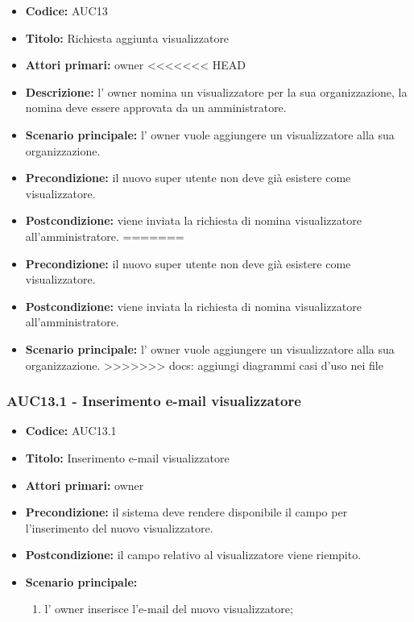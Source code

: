 \documentclass[casi-duso]{subfiles}
\begin{document}
\begin{itemize}
  \item \textbf{Codice:} AUC13
  \item \textbf{Titolo:} Richiesta aggiunta visualizzatore
  \item \textbf{Attori primari:} owner
<<<<<<< HEAD
  \item \textbf{Descrizione:} l' owner nomina un visualizzatore per la sua organizzazione, la nomina deve essere approvata da un amministratore.
  \item \textbf{Scenario principale:} l' owner vuole aggiungere un visualizzatore alla sua organizzazione.
  \item \textbf{Precondizione:} il nuovo super utente non deve già esistere come visualizzatore.
  \item \textbf{Postcondizione:} viene inviata la richiesta di nomina visualizzatore all'amministratore.
=======
  \item \textbf{Precondizione:} il nuovo super utente non deve già esistere come visualizzatore.
  \item \textbf{Postcondizione:} viene inviata la richiesta di nomina visualizzatore all'amministratore.
  \item \textbf{Scenario principale:} l' owner vuole aggiungere un visualizzatore alla sua organizzazione.
>>>>>>> docs: aggiungi diagrammi casi d'uso nei file
\end{itemize}

\subsubsection{AUC13.1 - Inserimento e-mail visualizzatore}%
\label{subsub:AUC13.1}
\begin{itemize}
  \item \textbf{Codice:} AUC13.1
  \item \textbf{Titolo:} Inserimento e-mail visualizzatore
  \item \textbf{Attori primari:} owner
  \item \textbf{Precondizione:} il sistema deve rendere disponibile il campo per l'inserimento del nuovo visualizzatore.
  \item \textbf{Postcondizione:} il campo relativo al visualizzatore viene riempito.
  \item \textbf{Scenario principale:} 
  \begin{enumerate}
    \item l' owner inserisce l'e-mail del nuovo visualizzatore;
  \end{enumerate}
\end{itemize}
\end{document}
